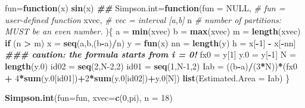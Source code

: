 \documentclass[
]{book}
\newenvironment{Shaded}{\begin{snugshade}}{\end{snugshade}}
\newcommand{\AttributeTok}[1]{\textcolor[rgb]{0.13,0.29,0.53}{#1}}
\newcommand{\CommentTok}[1]{\textcolor[rgb]{0.56,0.35,0.01}{\textit{#1}}}
\newcommand{\ConstantTok}[1]{\textcolor[rgb]{0.56,0.35,0.01}{#1}}
\newcommand{\ControlFlowTok}[1]{\textcolor[rgb]{0.13,0.29,0.53}{\textbf{#1}}}
\newcommand{\DecValTok}[1]{\textcolor[rgb]{0.00,0.00,0.81}{#1}}
\newcommand{\DocumentationTok}[1]{\textcolor[rgb]{0.56,0.35,0.01}{\textbf{\textit{#1}}}}
\newcommand{\FloatTok}[1]{\textcolor[rgb]{0.00,0.00,0.81}{#1}}
\newcommand{\FunctionTok}[1]{\textcolor[rgb]{0.13,0.29,0.53}{\textbf{#1}}}
\newcommand{\NormalTok}[1]{#1}
\newcommand{\OtherTok}[1]{\textcolor[rgb]{0.56,0.35,0.01}{#1}}
\newcommand{\SpecialCharTok}[1]{\textcolor[rgb]{0.81,0.36,0.00}{\textbf{#1}}}
\begin{document}
\begin{Shaded}
\begin{Highlighting}[]
\NormalTok{fun}\OtherTok{=}\ControlFlowTok{function}\NormalTok{(x) }\FunctionTok{sin}\NormalTok{(x)}
\DocumentationTok{\#\#}
\NormalTok{Simpson.int}\OtherTok{=}\ControlFlowTok{function}\NormalTok{(}\AttributeTok{fun =} \ConstantTok{NULL}\NormalTok{,     }\CommentTok{\# fun = user{-}defined function}
\NormalTok{                     xvec,           }\CommentTok{\# vec = interval [a,b]}
\NormalTok{                     n          }\CommentTok{\# number of partitions: MUST be an even number.}
\NormalTok{                     )\{}
\NormalTok{  a }\OtherTok{=} \FunctionTok{min}\NormalTok{(xvec)}
\NormalTok{  b }\OtherTok{=} \FunctionTok{max}\NormalTok{(xvec)}
\NormalTok{  m }\OtherTok{=} \FunctionTok{length}\NormalTok{(xvec)}
  \ControlFlowTok{if}\NormalTok{ (n }\SpecialCharTok{\textgreater{}}\NormalTok{ m) x }\OtherTok{=} \FunctionTok{seq}\NormalTok{(a,b,(b}\SpecialCharTok{{-}}\NormalTok{a)}\SpecialCharTok{/}\NormalTok{n)}
\NormalTok{  y }\OtherTok{=} \FunctionTok{fun}\NormalTok{(x)}
\NormalTok{  nn }\OtherTok{=} \FunctionTok{length}\NormalTok{(y)}
\NormalTok{  h }\OtherTok{=}\NormalTok{ x[}\SpecialCharTok{{-}}\DecValTok{1}\NormalTok{] }\SpecialCharTok{{-}}\NormalTok{ x[}\SpecialCharTok{{-}}\NormalTok{nn]}
  \DocumentationTok{\#\#\# caution: the formula starts from i = 0!}
\NormalTok{  fx0 }\OtherTok{=}\NormalTok{ y[}\DecValTok{1}\NormalTok{]}
\NormalTok{  y}\FloatTok{.0} \OtherTok{=}\NormalTok{ y[}\SpecialCharTok{{-}}\DecValTok{1}\NormalTok{]}
\NormalTok{  N }\OtherTok{=} \FunctionTok{length}\NormalTok{(y}\FloatTok{.0}\NormalTok{)}
\NormalTok{  id02 }\OtherTok{=} \FunctionTok{seq}\NormalTok{(}\DecValTok{2}\NormalTok{,N}\DecValTok{{-}2}\NormalTok{,}\DecValTok{2}\NormalTok{)}
\NormalTok{  id01 }\OtherTok{=} \FunctionTok{seq}\NormalTok{(}\DecValTok{1}\NormalTok{,N}\DecValTok{{-}1}\NormalTok{,}\DecValTok{2}\NormalTok{)}
\NormalTok{  Iab }\OtherTok{=}\NormalTok{ ((b}\SpecialCharTok{{-}}\NormalTok{a)}\SpecialCharTok{/}\NormalTok{(}\DecValTok{3}\SpecialCharTok{*}\NormalTok{N))}\SpecialCharTok{*}\NormalTok{(fx0 }\SpecialCharTok{+} \DecValTok{4}\SpecialCharTok{*}\FunctionTok{sum}\NormalTok{(y}\FloatTok{.0}\NormalTok{[id01])}\SpecialCharTok{+}\DecValTok{2}\SpecialCharTok{*}\FunctionTok{sum}\NormalTok{(y}\FloatTok{.0}\NormalTok{[id02])}\SpecialCharTok{+}\NormalTok{y}\FloatTok{.0}\NormalTok{[N])}
  \FunctionTok{list}\NormalTok{(}\AttributeTok{Estimated.Area =}\NormalTok{ Iab)}
\NormalTok{\}}

\FunctionTok{Simpson.int}\NormalTok{(}\AttributeTok{fun=}\NormalTok{fun, }\AttributeTok{xvec=}\FunctionTok{c}\NormalTok{(}\DecValTok{0}\NormalTok{,pi), }\AttributeTok{n =} \DecValTok{18}\NormalTok{)}
\end{Highlighting}
\end{Shaded}
\end{document}
